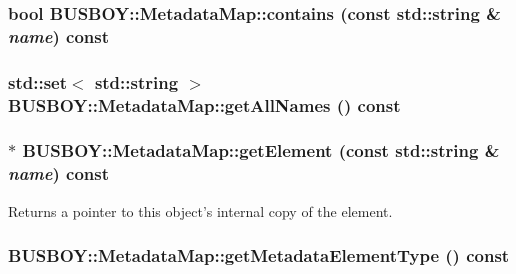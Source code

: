 \label{classBUSBOY_1_1MetadataMap_add9f26ea2cb4cc406f5683ed467e787e}
\hypertarget{classBUSBOY_1_1MetadataMap_a590a299a06b9cf089065dfc13bfe0e22}{
\subsubsection[{contains}]{\setlength{\rightskip}{0pt plus 5cm}bool BUSBOY::MetadataMap::contains (const std::string \& {\em name}) const}}
\label{classBUSBOY_1_1MetadataMap_a590a299a06b9cf089065dfc13bfe0e22}
\hypertarget{classBUSBOY_1_1MetadataMap_a40964a5add4322feaadfb1ec5f3486e3}{
\subsubsection[{getAllNames}]{\setlength{\rightskip}{0pt plus 5cm}std::set$<$ std::string $>$ BUSBOY::MetadataMap::getAllNames () const}}
\label{classBUSBOY_1_1MetadataMap_a40964a5add4322feaadfb1ec5f3486e3}
\hypertarget{classBUSBOY_1_1MetadataMap_a4fa5c6be6a26c7f6066a682e03cb14df}{
\subsubsection[{getElement}]{ $\ast$ BUSBOY::MetadataMap::getElement (const std::string \& {\em name}) const}}
\label{classBUSBOY_1_1MetadataMap_a4fa5c6be6a26c7f6066a682e03cb14df}


Returns a pointer to this object's internal copy of the element. \hypertarget{classBUSBOY_1_1MetadataMap_af64fb7f0f22996956ec2adb09892dcb5}{
\subsubsection[{getMetadataElementType}]{ BUSBOY::MetadataMap::getMetadataElementType () const}}
\label{classBUSBOY_1_1MetadataMap_af64fb7f0f22996956ec2adb09892dcb5}


